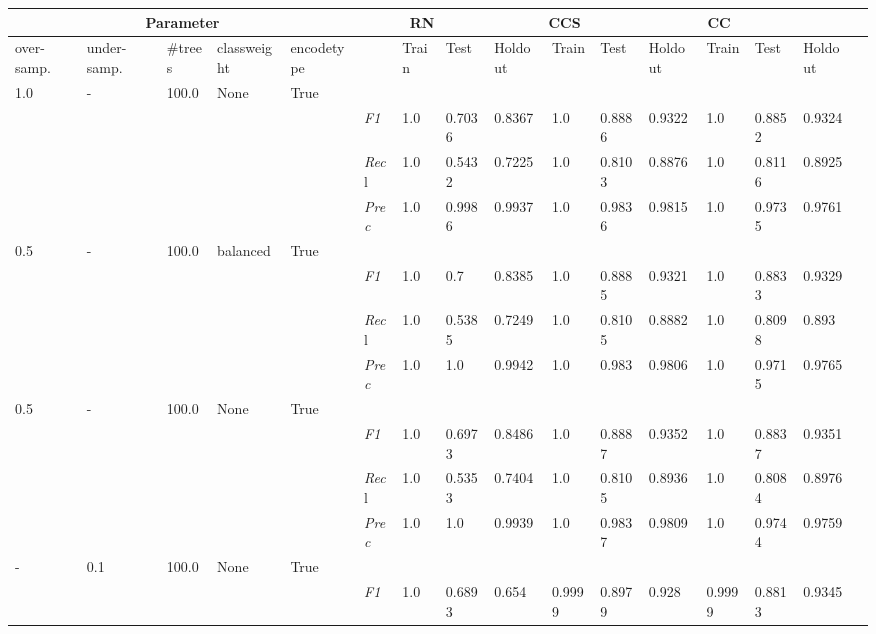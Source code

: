 \begin{table}[]
\tiny
\tabcolsep=0.11cm
\begin{tabularx}{\textwidth}{XXXXX|X|XXX|XXX|XXXX}
\toprule
\multicolumn{5}{c}{Parameter} & \multicolumn{3}{c}{RN} & \multicolumn{3}{c}{CCS} & \multicolumn{3}{c}{CC} \\ \midrule
over-\newline samp. & under-\newline samp. & \#trees & class\newline weight & encode\newline type  & & Train &  Test & Holdout & Train &  Test & Holdout & Train &  Test & Holdout \\ \midrule
1.0 & - & 100.0 & None & True& & & & & & & & & \\
& & & & & \textit{F1} & 1.0 & 0.7036 & 0.8367 & 1.0 & 0.8886        & 0.9322        & 1.0        & 0.8852        & 0.9324        \\
& & & & & \textit{Rec}l & 1.0 & 0.5432 & 0.7225    & 1.0 & 0.8103    & 0.8876    & 1.0    & 0.8116    & 0.8925    \\
& & & & & \textit{Prec} & 1.0 & 0.9986 & 0.9937 & 1.0 & 0.9836 & 0.9815 & 1.0 & 0.9735 & 0.9761 \\ \midrule
0.5 & - & 100.0 & balanced & True& & & & & & & & & \\
& & & & & \textit{F1} & 1.0 & 0.7 & 0.8385 & 1.0 & 0.8885        & 0.9321        & 1.0        & 0.8833        & 0.9329        \\
& & & & & \textit{Rec}l & 1.0 & 0.5385 & 0.7249    & 1.0 & 0.8105    & 0.8882    & 1.0    & 0.8098    & 0.893    \\
& & & & & \textit{Prec} & 1.0 & 1.0 & 0.9942 & 1.0 & 0.983 & 0.9806 & 1.0 & 0.9715 & 0.9765 \\ \midrule
0.5 & - & 100.0 & None & True& & & & & & & & & \\
& & & & & \textit{F1} & 1.0 & 0.6973 & 0.8486 & 1.0 & 0.8887        & 0.9352        & 1.0        & 0.8837        & 0.9351        \\
& & & & & \textit{Rec}l & 1.0 & 0.5353 & 0.7404    & 1.0 & 0.8105    & 0.8936    & 1.0    & 0.8084    & 0.8976    \\
& & & & & \textit{Prec} & 1.0 & 1.0 & 0.9939 & 1.0 & 0.9837 & 0.9809 & 1.0 & 0.9744 & 0.9759 \\ \midrule
- & 0.1 & 100.0 & None & True& & & & & & & & & \\
& & & & & \textit{F1} & 1.0 & 0.6893 & 0.654 & 0.9999 & 0.8979        & 0.928        & 0.9999        & 0.8813        & 0.9345        \\

\end{tabularx}
\end{table}
